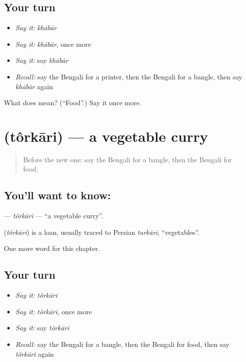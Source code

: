 \subsection*{Your turn}
\begin{itemize}
\raggedright
  \item \emph{Say it:} \emph{khābār}
  \item \emph{Say it:} \emph{khābār}, once more
  \item \emph{Say it:} say \emph{khābār}
  \item \emph{Recall:} say the Bengali for a printer, then the Bengali for a bangle, then say \emph{khābār} again
\end{itemize}

\begin{tcolorbox}[breakable,colback=teal!4,colframe=teal!35!black,title={Before you move on}]
What does  mean? (\textquotedblleft{}Food\textquotedblright{}.) Say it once more.
\end{tcolorbox}
\section[\texorpdfstring{\bn{তরকারি} (tôrkāri)}{তরকারি (tôrkāri)}]{ (tôrkāri) — a vegetable curry}

\label{lesson:BN-C223-torkari}



\begin{quote}
Before the new one: say the Bengali for a bangle, then the Bengali for food.
\end{quote}

\subsection*{You'll want to know: }
\textbf{} — \emph{tôrkāri} — \textquotedblleft{}a vegetable curry\textquotedblright{}.

\begin{cousinweb}
\textbf{} (\emph{tôrkāri}) is a loan, usually traced to Persian \emph{tarkārī}, \textquotedblleft{}vegetables\textquotedblright{}.
\end{cousinweb}

\begin{grammarlens}[title={What you've built}]
One more word for this chapter.
\end{grammarlens}

\subsection*{Your turn}
\begin{itemize}
\raggedright
  \item \emph{Say it:} \emph{tôrkāri}
  \item \emph{Say it:} \emph{tôrkāri}, once more
  \item \emph{Say it:} say \emph{tôrkāri}
  \item \emph{Recall:} say the Bengali for a bangle, then the Bengali for food, then say \emph{tôrkāri} again
\end{itemize}

